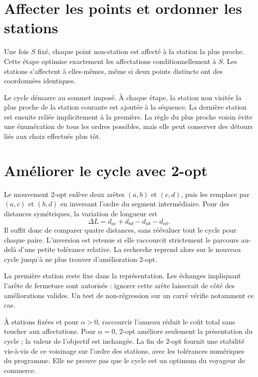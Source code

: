 \section{Affecter les points et ordonner les stations}
Une fois $S$ fixé, chaque point non-station est affecté à la station la plus
proche. Cette étape optimise exactement les affectations conditionnellement à
$S$. Les stations s'affectent à elles-mêmes, même si deux points distincts ont
des coordonnées identiques.

Le cycle démarre au sommet imposé. À chaque étape, la station non visitée la
plus proche de la station courante est ajoutée à la séquence. La dernière
station est ensuite reliée implicitement à la première. La règle du plus proche
voisin évite une énumération de tous les ordres possibles, mais elle peut
conserver des détours liés aux choix effectués plus tôt.

\section{Améliorer le cycle avec 2-opt}
Le mouvement 2-opt enlève deux arêtes $(a,b)$ et $(c,d)$, puis les remplace
par $(a,c)$ et $(b,d)$ en inversant l'ordre du segment intermédiaire.
Pour des distances symétriques, la variation de longueur est
\begin{equation}
\Delta L=d_{ac}+d_{bd}-d_{ab}-d_{cd}.
\end{equation}
Il suffit donc de comparer quatre distances, sans réévaluer tout le cycle
pour chaque paire. L'inversion est retenue si elle raccourcit strictement
le parcours au-delà d'une petite tolérance relative. La recherche reprend
alors sur le nouveau cycle jusqu'à ne plus trouver d'amélioration 2-opt.

La première station reste fixe dans la représentation. Les échanges impliquant
l'arête de fermeture sont autorisés : ignorer cette arête laisserait de côté
des améliorations valides. Un test de non-régression sur un carré vérifie
notamment ce cas.

À stations fixées et pour $\alpha>0$, raccourcir l'anneau réduit le coût total
sans toucher aux affectations. Pour $\alpha=0$, 2-opt améliore seulement la
présentation du cycle ; la valeur de l'objectif est inchangée. La fin de 2-opt
fournit une stabilité vis-à-vis de ce voisinage sur l'ordre des stations, avec
les tolérances numériques du programme. Elle ne prouve pas que le cycle est
un optimum du voyageur de commerce.

